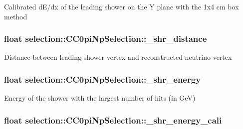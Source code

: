 Calibrated d\-E/dx of the leading shower on the Y plane with the 1x4 cm box method \hypertarget{classselection_1_1CC0piNpSelection_a20705dc212e16009a0ce4ace27d54af7}{
\subsubsection[{\-\_\-shr\-\_\-distance}]{\setlength{\rightskip}{0pt plus 5cm}float selection\-::\-C\-C0pi\-Np\-Selection\-::\-\_\-shr\-\_\-distance\hspace{0.3cm}{\ttfamily [private]}}}\label{classselection_1_1CC0piNpSelection_a20705dc212e16009a0ce4ace27d54af7}
Distance between leading shower vertex and reconstructed neutrino vertex \hypertarget{classselection_1_1CC0piNpSelection_abf854f061d0476dc08ae8b3d71e7a86d}{
\subsubsection[{\-\_\-shr\-\_\-energy}]{\setlength{\rightskip}{0pt plus 5cm}float selection\-::\-C\-C0pi\-Np\-Selection\-::\-\_\-shr\-\_\-energy\hspace{0.3cm}{\ttfamily [private]}}}\label{classselection_1_1CC0piNpSelection_abf854f061d0476dc08ae8b3d71e7a86d}
Energy of the shower with the largest number of hits (in Ge\-V) \hypertarget{classselection_1_1CC0piNpSelection_a910f18dc66ac2f22aa8cbdd6b86c7d0e}{
\subsubsection[{\-\_\-shr\-\_\-energy\-\_\-cali}]{\setlength{\rightskip}{0pt plus 5cm}float selection\-::\-C\-C0pi\-Np\-Selection\-::\-\_\-shr\-\_\-energy\-\_\-cali\hspace{0.3cm}{\ttfamily [private]}}}\label{classselection_1_1CC0piNpSelection_a910f18dc66ac2f22aa8cbdd6b86c7d0e}
